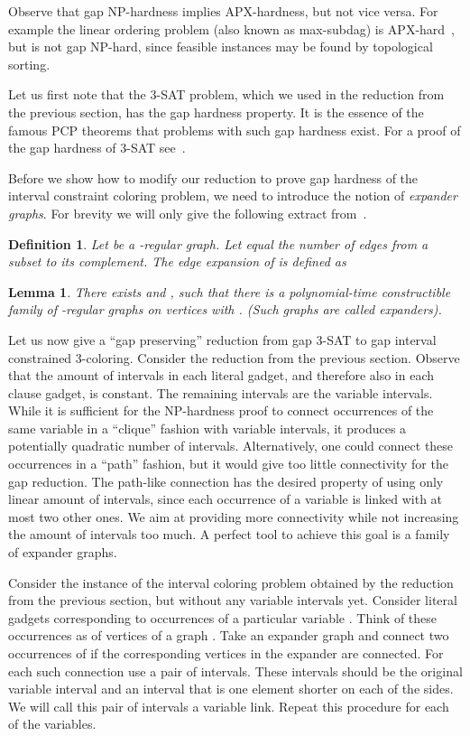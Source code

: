 \documentclass[a4paper,11pt]{article}
\theoremstyle{theorem}
\newtheorem{definition}[theorem]{Definition}
\newtheorem{lemma}[theorem]{Lemma}
\begin{document}
Observe that gap NP-hardness implies APX-hardness, but not vice versa.
For example the linear ordering problem (also known as max-subdag) is APX-hard~\cite{papa_apx}, 
but is not gap NP-hard, since feasible instances may be found by topological sorting.

Let us first note that the 3-SAT problem, which we used in the reduction
from the previous section, has the gap hardness property. It is the essence
of the famous PCP theorems that problems with such gap hardness exist.
For a proof of the gap hardness of 3-SAT see~\cite{gap_amp}.

Before we show how to modify our reduction to prove gap hardness of the interval constraint coloring problem,
we need to introduce the notion of \emph{expander graphs}. 
For brevity we will only give the following extract from~\cite{gap_amp}.

\begin{definition}
  Let  be a -regular graph. Let 
  equal the number of edges from a subset  to its complement. The \emph{edge expansion}
  of  is defined as
  
\end{definition}

\begin{lemma}
  There exists  and , such that there is a polynomial-time constructible family
   of -regular graphs  on  vertices with . (Such graphs
  are called expanders).
\end{lemma}

Let us now give a ``gap preserving'' reduction from gap 3-SAT to 
gap interval constrained 3-coloring. Consider the reduction from the previous section.
Observe that the amount of intervals in each literal gadget, and therefore also in each clause gadget, is constant.
The remaining intervals are the variable intervals. While it is sufficient for 
the NP-hardness proof to connect occurrences of the same variable in a ``clique'' fashion with
variable intervals, it produces a potentially quadratic number of intervals.
Alternatively, one could connect these occurrences in a ``path'' fashion,
but it would give too little connectivity for the gap reduction.
The path-like connection has the desired property of using only linear amount of intervals,
since each occurrence of a variable is linked with at most two other ones.
We aim at providing more connectivity while not increasing the amount of intervals too much.
A perfect tool to achieve this goal is a family of expander graphs.

Consider the instance of the interval coloring problem obtained by the reduction
from the previous section, but without any variable intervals yet.
Consider literal gadgets corresponding to occurrences of a particular variable .
Think of these occurrences as of vertices of a graph . Take an expander graph  
and connect two occurrences of  if the corresponding vertices in the expander are connected. 
For each such connection use a pair of intervals. These intervals should be the
original variable interval and an interval that is one element shorter on each of the sides.
We will call this pair of intervals a variable link.
Repeat this procedure for each of the variables.
\end{document}
